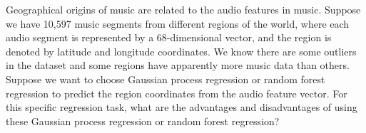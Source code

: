 Geographical origins of music are related to the audio features in music. Suppose we have 10,597 music segments from different regions of the world, where each audio segment is represented by a 68-dimensional vector, and the region is denoted by latitude and longitude coordinates. We know there are some outliers in the dataset and some regions have apparently more music data than others. Suppose we want to choose Gaussian process regression or random forest regression to predict the region coordinates from the audio feature vector. For this specific regression task, what are the advantages and disadvantages of using these Gaussian process regression or random forest regression?
